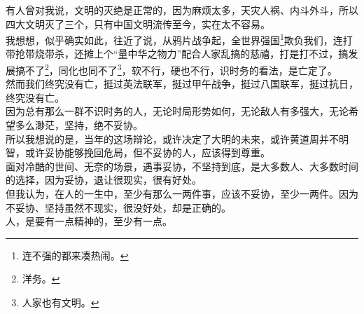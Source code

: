 \begin{multicols}{\theparacolNo}
有人曾对我说，文明的灭绝是正常的，因为麻烦太多，天灾人祸、内斗外斗，所以四大文明灭了三个，只有中国文明流传至今，实在太不容易。\\

我想想，似乎确实如此，往近了说，从鸦片战争起，全世界强国\footnote{连不强的都来凑热闹。}欺负我们，连打带抢带烧带杀，还摊上个“量中华之物力”配合人家乱搞的慈禧，打是打不过，搞发展搞不了\footnote{洋务。}，同化也同不了\footnote{人家也有文明。}，软不行，硬也不行，识时务的看法，是亡定了。\\

然而我们终究没有亡，挺过英法联军，挺过甲午战争，挺过八国联军，挺过抗日，终究没有亡。\\

因为总有那么一群不识时务的人，无论时局形势如何，无论敌人有多强大，无论希望多么渺茫，坚持，绝不妥协。\\

所以我想说的是，当年的这场辩论，或许决定了大明的未来，或许黄道周并不明智，或许妥协能够挽回危局，但不妥协的人，应该得到尊重。\\

面对冷酷的世间、无奈的场景，遇事妥协，不坚持到底，是大多数人、大多数时间的选择，因为妥协，退让很现实，很有好处。\\

但我认为，在人的一生中，至少有那么一两件事，应该不妥协，至少一两件。因为不妥协、坚持虽然不现实，很没好处，却是正确的。\\

人，是要有一点精神的，至少有一点。\\
\ifnum{}
	\end{multicols}
\fi
\newpage
